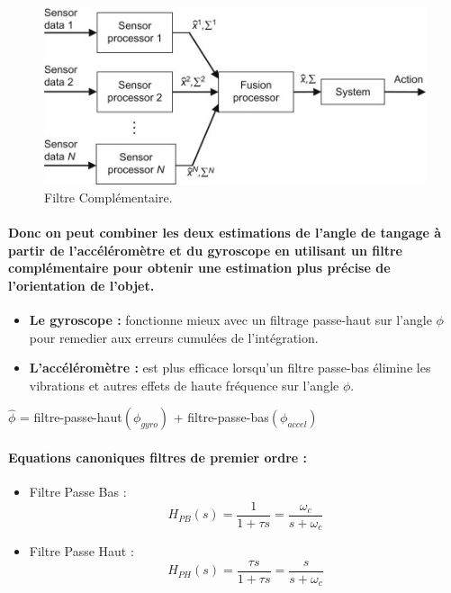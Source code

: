 \paragraph*{}
\begin{figure}[!htpb]
	\centering
	\includegraphics[width=\linewidth]{Figures/sensor-fusion.jpg}
	\caption{Filtre Complémentaire.}
\end{figure}

\paragraph{Donc on peut combiner les deux estimations de l'angle de tangage à partir de l'accéléromètre et du gyroscope en utilisant un filtre complémentaire pour obtenir une estimation plus précise de l'orientation de l'objet.}

\begin{itemize}
	\item \textbf{Le gyroscope :} fonctionne mieux avec un filtrage passe-haut sur l'angle $\phi$ pour remedier aux erreurs cumulées de l'intégration.
	\item \textbf{L'accéléromètre :} est plus efficace lorsqu'un filtre passe-bas élimine les vibrations et autres effets de haute fréquence sur l'angle $\phi$.
\end{itemize}

$\hat{\phi}$ = filtre-passe-haut$(\phi_{gyro})$ + filtre-passe-bas$(\phi_{accel})$


\paragraph{Equations canoniques filtres de premier ordre :}

\begin{itemize}
	\item Filtre Passe Bas : \begin{equation}
		H_{PB}(s) = \frac{1}{1 + \tau s} = \frac{\omega_c}{s + \omega_c}
	\end{equation}
	\item Filtre Passe Haut : \begin{equation}
		H_{PH}(s) = \frac{\tau s}{1 + \tau s} = \frac{s}{s + \omega_c}
	\end{equation}
\end{itemize}


